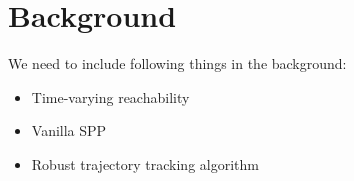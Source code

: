 \section{Background}

We need to include following things in the background:
\begin{itemize}
\item Time-varying reachability
\item Vanilla SPP
\item Robust trajectory tracking algorithm
\end{itemize}


